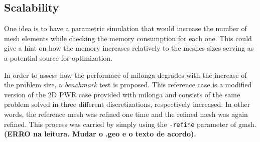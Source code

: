\documentclass{anstrans}
\begin{document}



%



\subsection{Scalability}

One idea is to have a parametric simulation that would increase the number of mesh elements while checking the
memory consumption for each one. This could give a hint on how the memory increases relatively to the meshes sizes
serving as a potential source for optimization.

In order to assess how the performace of milonga degrades with the increase of the problem size, a \textit{benchmark}
test is proposed. This reference case is a modified version of the 2D PWR case provided with milonga \cite{milonga}
and consists of the same problem solved in three different discretizations, respectively increased. In other words,
the reference mesh was refined one time and the refined mesh was again refined. This process was carried by simply
using the \texttt{-refine} parameter of gmsh. \textbf{(ERRO na leitura. Mudar o .geo e o texto de acordo).}
\end{document}
